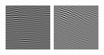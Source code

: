 \begin{figure}[ht]
\begin{center}
  \includegraphics[width=\columnwidth/9]{ch4/figures/real_-1_4.jpg}
  \includegraphics[width=\columnwidth/9]{ch4/figures/real_-1_5.jpg}

\end{center}
\end{figure}
